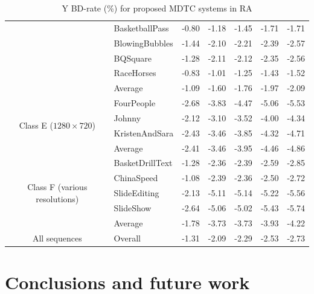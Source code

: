 \documentclass[11pt,a4paper,openright,twoside]{book}
\numberwithin{equation}{section} %
\numberwithin{figure}{section} %
\numberwithin{table}{section} %
\begin{document}
\begin{table}[tb]
\begin{tabularx}{\textwidth}{c|X|r|rrrr}
		& BasketballPass         & -0.80 & -1.18 & -1.45 & -1.71 & -1.71 \\
		& BlowingBubbles         & -1.44 & -2.10 & -2.21 & -2.39 & -2.57 \\
		& BQSquare               & -1.28 & -2.11 & -2.12 & -2.35 & -2.56 \\
		& RaceHorses             & -0.83 & -1.01 & -1.25 & -1.43 & -1.52 \\
		\cline{2-7} &
		Average                  & -1.09 & -1.60 & -1.76 & -1.97 & -2.09 \\
		\hline
		\hline
		\multirow{4}{2cm}{\centering Class E ($1280\times720$)}
		& FourPeople             & -2.68 & -3.83 & -4.47 & -5.06 & -5.53 \\
		& Johnny                 & -2.12 & -3.10 & -3.52 & -4.00 & -4.34 \\
		& KristenAndSara         & -2.43 & -3.46 & -3.85 & -4.32 & -4.71 \\
		\cline{2-7} &
		Average                  & -2.41 & -3.46 & -3.95 & -4.46 & -4.86 \\
		\hline
		\hline
		\multirow{5}{2cm}{\centering Class F (various resolutions)}
		& BasketDrillText        & -1.28 & -2.36 & -2.39 & -2.59 & -2.85 \\
		& ChinaSpeed             & -1.08 & -2.39 & -2.36 & -2.50 & -2.72 \\
		& SlideEditing           & -2.13 & -5.11 & -5.14 & -5.22 & -5.56 \\
		& SlideShow              & -2.64 & -5.06 & -5.02 & -5.43 & -5.74 \\
		\cline{2-7} &
		Average                  & -1.78 & -3.73 & -3.73 & -3.93 & -4.22 \\
		\hline
		\hline
		All sequences &
		Overall                  & -1.31 & -2.09 & -2.29 & -2.53 & -2.73 \\
	\end{tabularx}
	\caption{Y \acs{BD}-rate (\%) for proposed \acs{MDTC} systems in \acs{RA}}
	\label{tab:final_systems_ra}
\end{table}

\chapter*{Conclusions and future work}
\label{cha:conclusions_and_future_work}

\pagestyle{empty}
\end{document}
